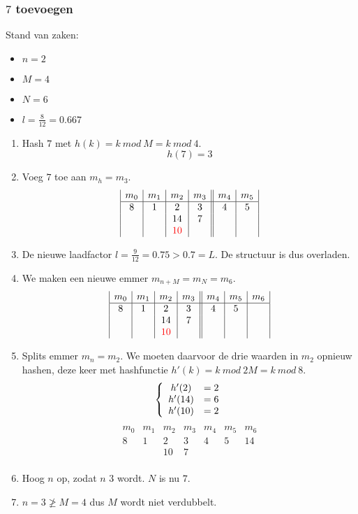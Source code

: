 \documentclass[hashing.tex]{subfiles}
\begin{document}
\subsubsection{$7$ toevoegen}
Stand van zaken:
\begin{multicols}{4}
\begin{itemize}
\item $n=2$
\item $M=4$
\item $N=6$
\item $l=\frac{8}{12} = 0.667$
\end{itemize}
\end{multicols}
\begin{enumerate}
\item Hash $7$ met $h(k) = k\ mod\ M = k\ mod\ 4$.
\[
h(7) = 3
\]
\item Voeg $7$ toe aan $m_h = m_{3}$.
\[
\begin{array}{|c|c|c|c||c|c|}
m_0&m_1&m_2&m_3&m_4&m_5\\
\hline
8 & 1 & 2 & 3 & 4 & 5\\
  &   & 14& 7 &   &\\
  &   & \color{red}10 & & &
\end{array} 
\]
\item De nieuwe laadfactor $l=\frac{9}{12} = 0.75 > 0.7 = L$. De structuur is dus overladen.
\item We maken een nieuwe emmer $m_{n+M} = m_{N} = m_6$.
\[
\begin{array}{|c|c|c|c||c|c|c|}
m_0&m_1&m_2&m_3&m_4&m_5&m_6\\
\hline
8 & 1 & 2 & 3 & 4 & 5& \\
  &   & 14& 7 &   &&\\
  &   & \color{red}10 & & &&
\end{array} 
\]
\item Splits emmer $m_n = m_2$. We moeten daarvoor de drie waarden in $m_2$ opnieuw hashen, deze keer met hashfunctie $h'(k) = k\ mod\ 2M = k\ mod\ 8$.
\[
\left\{
\begin{array}{c c}
h'(2) &= 2\\
h'(14) &= 6\\
h'(10) &= 2
\end{array}
\right.
\] 
\[
\begin{array}{|c|c|c|c||c|c|c|}
m_0&m_1&m_2&m_3&m_4&m_5&m_6\\
\hline
8 & 1 & 2 & 3 & 4 & 5& 14\\
  &   & 10& 7 &   &&\\
\end{array} 
\]
\item Hoog $n$ op, zodat $n$ $3$ wordt. $N$ is nu $7$.
\item $n = 3 \not\ge M=4$ dus $M$ wordt niet verdubbelt.
\end{enumerate}
\end{document}
